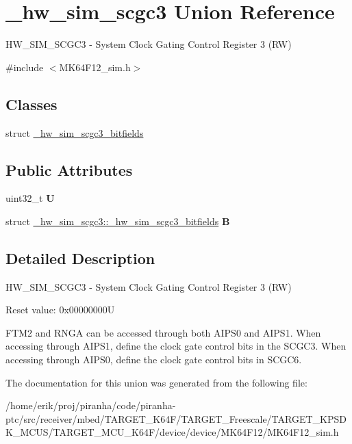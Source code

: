\hypertarget{union__hw__sim__scgc3}{}\section{\+\_\+hw\+\_\+sim\+\_\+scgc3 Union Reference}
\label{union__hw__sim__scgc3}


H\+W\+\_\+\+S\+I\+M\+\_\+\+S\+C\+G\+C3 -\/ System Clock Gating Control Register 3 (RW)  




{\ttfamily \#include $<$M\+K64\+F12\+\_\+sim.\+h$>$}

\subsection*{Classes}
\begin{DoxyCompactItemize}
\item 
struct \hyperlink{struct__hw__sim__scgc3_1_1__hw__sim__scgc3__bitfields}{\+\_\+hw\+\_\+sim\+\_\+scgc3\+\_\+bitfields}
\end{DoxyCompactItemize}
\subsection*{Public Attributes}
\begin{DoxyCompactItemize}
\item 
uint32\+\_\+t {\bfseries U}\hypertarget{union__hw__sim__scgc3_a0da5e15fbae70acf0cbfa5eb1ff6526b}{}\label{union__hw__sim__scgc3_a0da5e15fbae70acf0cbfa5eb1ff6526b}

\item 
struct \hyperlink{struct__hw__sim__scgc3_1_1__hw__sim__scgc3__bitfields}{\+\_\+hw\+\_\+sim\+\_\+scgc3\+::\+\_\+hw\+\_\+sim\+\_\+scgc3\+\_\+bitfields} {\bfseries B}\hypertarget{union__hw__sim__scgc3_aed6e0e00e5ca312843fe46adc5cf4b5a}{}\label{union__hw__sim__scgc3_aed6e0e00e5ca312843fe46adc5cf4b5a}

\end{DoxyCompactItemize}


\subsection{Detailed Description}
H\+W\+\_\+\+S\+I\+M\+\_\+\+S\+C\+G\+C3 -\/ System Clock Gating Control Register 3 (RW) 

Reset value\+: 0x00000000U

F\+T\+M2 and R\+N\+GA can be accessed through both A\+I\+P\+S0 and A\+I\+P\+S1. When accessing through A\+I\+P\+S1, define the clock gate control bits in the S\+C\+G\+C3. When accessing through A\+I\+P\+S0, define the clock gate control bits in S\+C\+G\+C6. 

The documentation for this union was generated from the following file\+:\begin{DoxyCompactItemize}
\item 
/home/erik/proj/piranha/code/piranha-\/ptc/src/receiver/mbed/\+T\+A\+R\+G\+E\+T\+\_\+\+K64\+F/\+T\+A\+R\+G\+E\+T\+\_\+\+Freescale/\+T\+A\+R\+G\+E\+T\+\_\+\+K\+P\+S\+D\+K\+\_\+\+M\+C\+U\+S/\+T\+A\+R\+G\+E\+T\+\_\+\+M\+C\+U\+\_\+\+K64\+F/device/device/\+M\+K64\+F12/M\+K64\+F12\+\_\+sim.\+h\end{DoxyCompactItemize}
